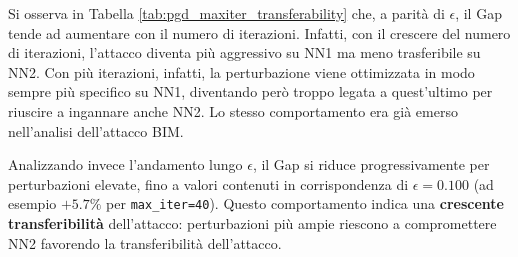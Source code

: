 \documentclass[a4paper, 12pt]{article}
\begin{document}
\begin{table}[htbp]
    \centering
    \vspace{0.2cm}
    \setlength{\tabcolsep}{12pt}      %
    \caption{Risultati di transferabilità per l'attacco PGD al variare di \texttt{max\_iter} (\texttt{nri} = 1).}
    \label{tab:pgd_maxiter_transferability}
\end{table}


Si osserva in Tabella \ref{tab:pgd_maxiter_transferability} che, a parità di $\epsilon$, il Gap tende ad aumentare con il numero 
di iterazioni. Infatti, con il crescere del numero di iterazioni, l'attacco diventa più aggressivo su NN1 ma meno trasferibile su NN2.
Con più iterazioni, infatti, la perturbazione viene ottimizzata in modo sempre 
più specifico su NN1, diventando però troppo legata a quest'ultimo per riuscire 
a ingannare anche NN2. Lo stesso comportamento era già emerso nell'analisi 
dell'attacco BIM.

Analizzando invece l'andamento lungo $\epsilon$, il Gap si riduce 
progressivamente per perturbazioni elevate, fino a valori contenuti in 
corrispondenza di $\epsilon = 0.100$ (ad esempio $+5.7\%$ per \texttt{max\_iter=40}). 
Questo comportamento indica una \textbf{crescente transferibilità} dell'attacco: 
perturbazioni più ampie riescono a compromettere NN2 favorendo la transferibilità dell'attacco.
\end{document}
